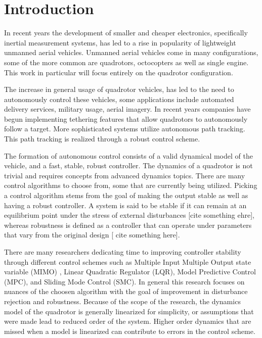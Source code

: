 \documentclass[twocolumn,10pt]{asme2e}
\begin{document}
\section{Introduction}
{\color{blue}
In recent years the development of smaller and cheaper electronics, specifically inertial measurement systems, has led to a rise in popularity of lightweight unmanned aerial vehicles. Unmanned aerial vehicles come in many configurations, some of the more common are quadrotors, octocopters as well as single engine. This work in particular will focus entirely on the quadrotor configuration. 

The increase in general usage of quadrotor vehicles, has led to the need to autonomously control these vehicles, some applications include automated delivery services, military usage, aerial imagery. In recent years companies have begun implementing tethering features that allow quadrotors to autonomously follow a target. More sophisticated systems utilize autonomous path tracking. This path tracking is realized through a robust control scheme.

The formation of autonomous control consists of a valid dynamical model of the vehicle, and a fast, stable, robust controller. The dynamics of a quadrotor is not trivial and requires concepts from advanced dynamics topics. There are many control algorithms to choose from, some that are currently being utilized. Picking a control algorithm stems from the goal of making the output stable as well as having a robust controller. A system is said to be stable if it can remain at an equilibrium point under the stress of external disturbances [cite something ehre], whereas robustness is defined as a controller that can operate under parameters that vary from the original design [ cite something here].

There are many researchers dedicating time to improving controller stability through different control schemes such as Multiple Input Multiple Output state variable (MIMO) \cite{FarameeVeeravat2014EotS}, Linear Quadratic Regulator (LQR), Model Predictive Control (MPC), and Sliding Mode Control (SMC). In general this research focuses on nuances of the choosen algorithm with the goal of improvement in disturbance rejection\cite{DenisKotarski2016CDFU} and robustness. Because of the scope of the research, the dynamics model of the quadrotor is generally linearized for simplicity, or assumptions that were made lead to reduced order of the system\cite{FarameeVeeravat2014EotS}. Higher order dynamics that are missed when a model is linearized can contribute to errors in the control scheme. 

}
\end{document}
